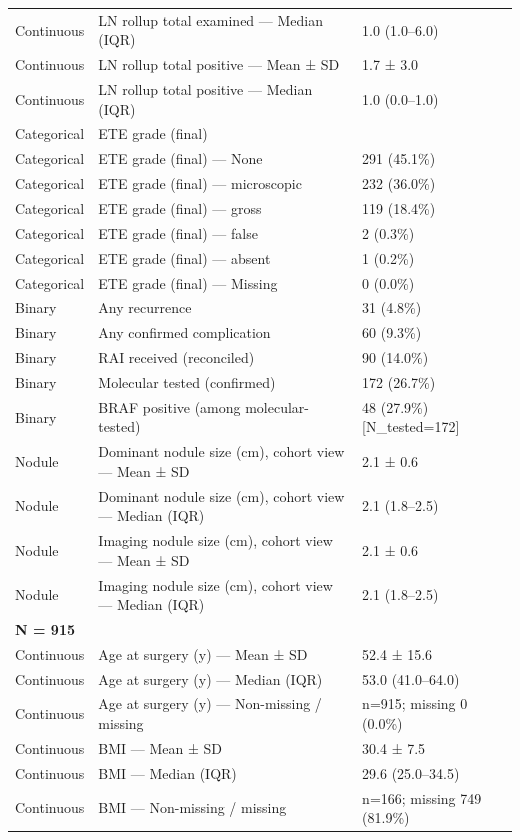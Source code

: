 \begin{table}[htbp]
\begin{tabular}{lll}
Continuous & LN rollup total examined — Median (IQR) & 1.0 (1.0–6.0) \\
Continuous & LN rollup total positive — Mean ± SD & 1.7 ± 3.0 \\
Continuous & LN rollup total positive — Median (IQR) & 1.0 (0.0–1.0) \\
Categorical & ETE grade (final) &  \\
Categorical & ETE grade (final) — None & 291 (45.1\%) \\
Categorical & ETE grade (final) — microscopic & 232 (36.0\%) \\
Categorical & ETE grade (final) — gross & 119 (18.4\%) \\
Categorical & ETE grade (final) — false & 2 (0.3\%) \\
Categorical & ETE grade (final) — absent & 1 (0.2\%) \\
Categorical & ETE grade (final) — Missing & 0 (0.0\%) \\
Binary & Any recurrence & 31 (4.8\%) \\
Binary & Any confirmed complication & 60 (9.3\%) \\
Binary & RAI received (reconciled) & 90 (14.0\%) \\
Binary & Molecular tested (confirmed) & 172 (26.7\%) \\
Binary & BRAF positive (among molecular-tested) & 48 (27.9\%) [N\_tested=172] \\
Nodule & Dominant nodule size (cm), cohort view — Mean ± SD & 2.1 ± 0.6 \\
Nodule & Dominant nodule size (cm), cohort view — Median (IQR) & 2.1 (1.8–2.5) \\
Nodule & Imaging nodule size (cm), cohort view — Mean ± SD & 2.1 ± 0.6 \\
Nodule & Imaging nodule size (cm), cohort view — Median (IQR) & 2.1 (1.8–2.5) \\
\multicolumn{3}{l}{\textbf{N = 915}} \\
Continuous & Age at surgery (y) — Mean ± SD & 52.4 ± 15.6 \\
Continuous & Age at surgery (y) — Median (IQR) & 53.0 (41.0–64.0) \\
Continuous & Age at surgery (y) — Non-missing / missing & n=915; missing 0 (0.0\%) \\
Continuous & BMI — Mean ± SD & 30.4 ± 7.5 \\
Continuous & BMI — Median (IQR) & 29.6 (25.0–34.5) \\
Continuous & BMI — Non-missing / missing & n=166; missing 749 (81.9\%) \\

\end{tabular}
\end{table}
